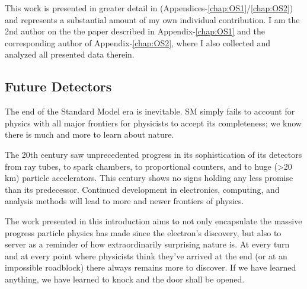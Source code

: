 This work is presented in greater detail in (Appendices-\ref{chap:OS1}/\ref{chap:OS2}) and represents a substantial amount of my own individual contribution. 
I am the 2nd author on the the paper described in Appendix-\ref{chap:OS1} and the corresponding author of Appendix-\ref{chap:OS2}, where I also collected and analyzed all presented data therein.

\subsection{Future Detectors}

The end of the Standard Model era is inevitable.
SM simply fails to account for physics with all major frontiers for physicists to accept its completeness; we know there is much and more to learn about nature.

The 20th century saw unprecedented progress in its sophistication of its detectors from ray tubes, to spark chambers, to proportional counters, and to huge (>20 km) particle accelerators.
This century shows no signs holding any less promise than its predecessor.
Continued development in electronics, computing, and analysis methods will lead to more and newer frontiers of physics.

The work presented in this introduction aims to not only encapsulate the massive progress particle physics has made since the electron's discovery, but also to server as a reminder of how extraordinarily surprising nature is.
At every turn and at every point where physicists think they've arrived at the end (or at an impossible roadblock) there always remains more to discover.
If we have learned anything, we have learned to knock and the door shall be opened.

